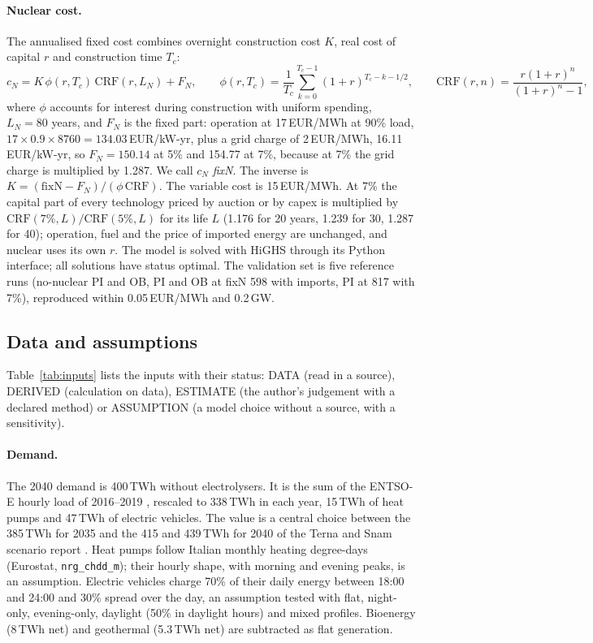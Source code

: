 \paragraph{Nuclear cost.} The annualised fixed cost combines overnight construction cost $K$, real cost of capital $r$ and construction time $T_c$:
\begin{equation}
c_N = K\,\phi(r,T_c)\,\mathrm{CRF}(r,L_N) + F_N ,\qquad
\phi(r,T_c)=\frac{1}{T_c}\sum_{k=0}^{T_c-1}(1+r)^{T_c-k-1/2},\qquad \mathrm{CRF}(r,n)=\frac{r(1+r)^n}{(1+r)^n-1},
\end{equation}
where $\phi$ accounts for interest during construction with uniform spending, $L_N=80$ years, and $F_N$ is the fixed part: operation at 17\,EUR/MWh at 90\% load, $17\times0.9\times8760=134.03$\,EUR/kW-yr, plus a grid charge of 2\,EUR/MWh, 16.11\,EUR/kW-yr, so $F_N=150.14$ at 5\% and 154.77 at 7\%, because at 7\% the grid charge is multiplied by 1.287. We call $c_N$ \emph{fixN}. The inverse is $K=(\mathrm{fixN}-F_N)/(\phi\,\mathrm{CRF})$. The variable cost is 15\,EUR/MWh. At 7\% the capital part of every technology priced by auction or by capex is multiplied by $\mathrm{CRF}(7\%,L)/\mathrm{CRF}(5\%,L)$ for its life $L$ (1.176 for 20 years, 1.239 for 30, 1.287 for 40); operation, fuel and the price of imported energy are unchanged, and nuclear uses its own $r$. The model is solved with HiGHS through its Python interface; all solutions have status optimal. The validation set is five reference runs (no-nuclear PI and OB, PI and OB at fixN 598 with imports, PI at 817 with 7\%), reproduced within 0.05\,EUR/MWh and 0.2\,GW.

\subsection{Data and assumptions}\label{sec:inputs}
Table~\ref{tab:inputs} lists the inputs with their status: DATA (read in a source), DERIVED (calculation on data), ESTIMATE (the author's judgement with a declared method) or ASSUMPTION (a model choice without a source, with a sensitivity).

\paragraph{Demand.} The 2040 demand is 400\,TWh without electrolysers. It is the sum of the ENTSO-E hourly load of 2016--2019 \citep{OPSD2020}, rescaled to 338\,TWh in each year, 15\,TWh of heat pumps and 47\,TWh of electric vehicles. The value is a central choice between the 385\,TWh for 2035 and the 415 and 439\,TWh for 2040 of the Terna and Snam scenario report \citep{DDS2024}. Heat pumps follow Italian monthly heating degree-days (Eurostat, \texttt{nrg\_chdd\_m}); their hourly shape, with morning and evening peaks, is an assumption. Electric vehicles charge 70\% of their daily energy between 18:00 and 24:00 and 30\% spread over the day, an assumption tested with flat, night-only, evening-only, daylight (50\% in daylight hours) and mixed profiles. Bioenergy (8\,TWh net) and geothermal (5.3\,TWh net) are subtracted as flat generation.

